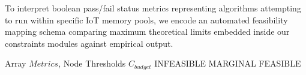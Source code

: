 To interpret boolean pass/fail status metrics representing algorithms attempting to run within specific IoT memory pools, we encode an automated feasibility mapping schema comparing maximum theoretical limits embedded inside our constraints modules against empirical output.

\begin{algorithm}
\caption{Class-Agnostic Status Classification}\label{alg:feasibility}
\begin{algorithmic}[1]
\Require Array $Metrics$, Node Thresholds $C_{budget}$
 \State \Return INFEASIBLE 
 \State \Return MARGINAL
\Else
 \State \Return FEASIBLE
\EndIf
\end{algorithmic}
\end{algorithm}
